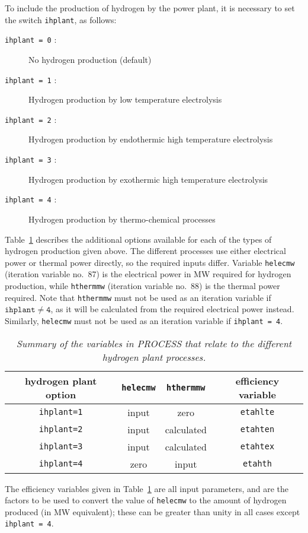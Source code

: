 \documentclass[11pt,a4paper]{report}
\begin{document}
To include the production of hydrogen by the power plant, it is necessary to
set the switch \texttt{ihplant}, as follows:
\begin{description}
\item [\texttt{ihplant = 0} :] No hydrogen production (default)
\item [\texttt{ihplant = 1} :] Hydrogen production by low temperature electrolysis
\item [\texttt{ihplant = 2} :] Hydrogen production by endothermic high
  temperature electrolysis
\item [\texttt{ihplant = 3} :] Hydrogen production by exothermic high
  temperature electrolysis
\item [\texttt{ihplant = 4} :] Hydrogen production by thermo-chemical processes
\end{description}
Table~\ref{tab:hplant} describes the additional options available for each of
the types of hydrogen production given above. The different processes use
either electrical power or thermal power directly, so the required inputs
differ. Variable \texttt{helecmw} (iteration variable no.\ 87) is the
electrical power in MW required for hydrogen production, while
\texttt{hthermmw} (iteration variable no.\ 88) is the thermal power
required. Note that \texttt{hthermmw} must not be used as an iteration
variable if $\mathtt{ihplant \not= 4}$, as it will be calculated from the
required electrical power instead. Similarly, \texttt{helecmw} must not be
used as an iteration variable if \texttt{ihplant = 4}.
\begin{table}[tbph]
\begin{center}
\begin{tabular}{||c|c|c|c||} \hline
hydrogen plant option & \texttt{helecmw} & \texttt{hthermmw} & efficiency
variable \\ \hline
\texttt{ihplant=1} & input & zero & \texttt{etahlte} \\
\texttt{ihplant=2} & input & calculated & \texttt{etahten} \\
\texttt{ihplant=3} & input & calculated & \texttt{etahtex} \\
\texttt{ihplant=4} & zero & input & \texttt{etahth} \\
\hline
\end{tabular}
\end{center}
\caption[Variables used in the hydrogen plant model]
{\label{tab:hplant}
  \textit{Summary of the variables in PROCESS that relate to
    the different hydrogen plant processes.}
}
\end{table}
The efficiency variables given in Table~\ref{tab:hplant} are all input
parameters, and are the factors to be used to convert the value of
\texttt{helecmw} to the amount of hydrogen produced (in MW equivalent); these
can be greater than unity in all cases except \texttt{ihplant = 4}.
\end{document}
